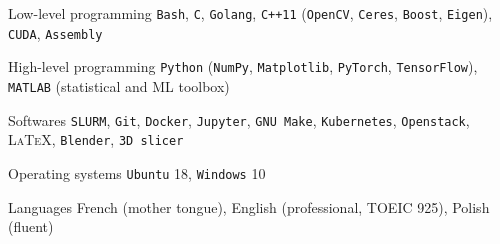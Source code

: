 


\begin{cvskills}


\cvskill
{Low-level programming} %
{\texttt{Bash}, \texttt{C}, \texttt{Golang}, \texttt{C++11} (\texttt{OpenCV}, \texttt{Ceres}, \texttt{Boost}, \texttt{Eigen}), \texttt{CUDA}, \texttt{Assembly}} %


\cvskill
{High-level programming} %
{\texttt{Python} (\texttt{NumPy}, \texttt{Matplotlib}, \texttt{PyTorch}, \texttt{TensorFlow}), \texttt{MATLAB} (statistical and ML toolbox)} %


\cvskill
{Softwares} %
{\texttt{SLURM}, \texttt{Git}, \texttt{Docker}, \texttt{Jupyter}, \texttt{GNU Make}, \texttt{Kubernetes}, \texttt{Openstack}, \textsc{\LaTeX}, \texttt{Blender}, \texttt{3D slicer}} %


\cvskill
{Operating systems} %
{\texttt{Ubuntu} 18, \texttt{Windows} 10} %


\cvskill
{Languages} %
{French (mother tongue), English (professional, TOEIC 925), Polish (fluent)} %


\end{cvskills}
